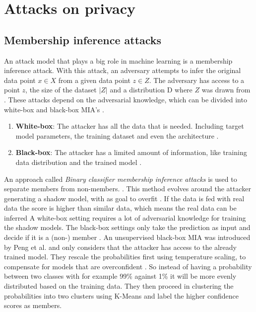 \chapter{Attacks on privacy} \label{section: MIA}
\section{Membership inference attacks}
An attack model that plays a big role in machine learning is a membership inference attack.
With this attack, an adversary attempts to infer the original data point $x \in X$ from a given data point $z \in Z$.
The adversary has access to a point $z$, the size of the dataset $|Z|$ and a distribution D where $Z$ was drawn from \citep{yeom_privacy_2018}.
These attacks depend on the adversarial knowledge, which can be divided into white-box and black-box MIA's \citep{hu_membership_2022}.
\begin{enumerate}
  \item \textbf{White-box}: The attacker has all the data that is needed. Including target model parameters, the training dataset and even the architecture \citep{hu_membership_2022}.
  \item \textbf{Black-box}: The attacker has a limited amount of information, like training data distribution and the trained model \citep{hu_membership_2022}.
\end{enumerate}

An approach called \textit{Binary classifier membership inference attacks} is used to separate members from non-members. \citep{hu_membership_2022}.
This method evolves around the attacker generating a shadow model, with as goal to overfit \citep{shokri_membership_2017}.
If the data is fed with real data the score is higher than similar data, which means the real data can be inferred \citep{shokri_membership_2017,jayaraman_evaluating_nodate}
A white-box setting requires a lot of adversarial knowledge for training the shadow models.
The black-box settings only take the prediction as input and decide if it is a (non-) member \citep{hu_membership_2022}.
An unsupervised black-box MIA was introduced by Peng et al. and only considers that the attacker has access to the already trained model.
They rescale the probabilities first using temperature scaling, to compensate for models that are overconfident \citep{peng_unsupervised_nodate}.
So instead of having a probability between two classes with for example 99\% against 1\% it will be more evenly distributed based on the training data.
They then proceed in clustering the probabilities into two clusters using K-Means and label the higher confidence scores as members.

